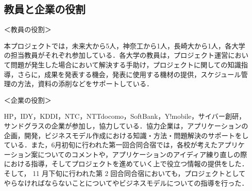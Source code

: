\subsection{教員と企業の役割}
\par ＜教員の役割＞
\par 本プロジェクトでは，未来大から5人，神奈工から1人，長崎大から1人，各大学の担当教員がそれぞれ参加している．各大学の教員は，プロジェクト運営において問題が発生した場合において解決する手助け，プロジェクトに関しての知識指導，さらに，成果を発表する機会，発表に使用する機材の提供，スケジュール管理の方法，資料の添削などをサポートしている．

\par ＜企業の役割＞
\par
HP，IDY，KDDI，NTC，NTTdocomo，SoftBank，Y!mobile，サイバー創研，サンドグラスの企業が参加し，協力している．協力企業は，アプリケーションの企画，開発，ビジネスモデル作成における知識・方法・問題解決のサポートをしている．また，6月初旬に行われた第一回合同合宿では，各校が考えたアプリケーション案についてのコメントや，アプリケーションのアイディア練り直しの際における指導，そしてプロジェクトを進めていく上で役立つ情報の提供をした．そして， 11 月下旬に行われた第 2 回合同合宿においても，プロジェクトとしてやらなければならないことについてやビジネスモデルについての指導を行った．
